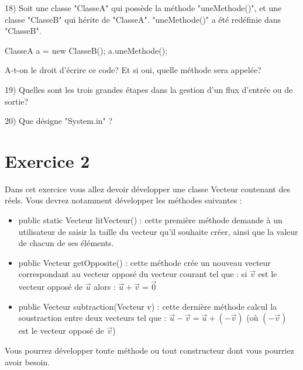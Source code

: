 \documentclass[a4paper,11pt]{article}
\begin{document}
18) Soit une classe "ClasseA" qui possède la méthode "uneMethode()", et une classe "ClasseB" qui hérite de "ClasseA". "uneMethode()" a été redéfinie dans "ClasseB".
\begin{java}
ClasseA a = new ClasseB();
a.uneMethode();
\end{java}
A-t-on le droit d'écrire ce code? Et si oui, quelle méthode sera appelée?


19) Quelles sont les trois grandes étapes dans la gestion d'un flux d'entrée ou de sortie?




20) Que désigne "System.in" ?


\section*{Exercice 2}

Dans cet exercice vous allez devoir développer une classe Vecteur contenant des réels. Vous devrez notamment développer les méthodes suivantes :
\begin{itemize}
  \item public static Vecteur litVecteur() : cette première méthode demande à un utilisateur de saisir la taille du vecteur qu'il souhaite créer, ainsi que la valeur de chacun de ses éléments.
  \item public Vecteur getOpposite() : cette méthode crée un nouveau vecteur correspondant au vecteur opposé du vecteur courant tel que : si $\vec{v}$ est le vecteur opposé de $\vec{u}$ alors : $\vec{u} + \vec{v} = \vec{0}$
  \item public Vecteur subtraction(Vecteur v) : cette dernière méthode calcul la soustraction entre deux vecteurs tel que : $\vec{u} - \vec{v} = \vec{u} + (-\vec{v})$ (où $(-\vec{v})$ est le vecteur opposé de $\vec{v}$)
\end{itemize}

Vous pourrez développer toute méthode ou tout constructeur dont vous pourriez avoir besoin.
\end{document}

